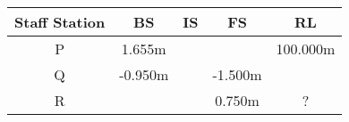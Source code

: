   \begin{table}[h]
        \centering
        \begin{tabular}{|c|c|c|c|c|}
        \hline
        Staff Station & BS & IS & FS & RL \\
        \hline
        P & 1.655m &  &  & 100.000m \\
        \hline
        Q & -0.950m &  & -1.500m & \\
        \hline
        R &  &  & 0.750m & ? \\
        \hline
        \end{tabular}
    \end{table}

